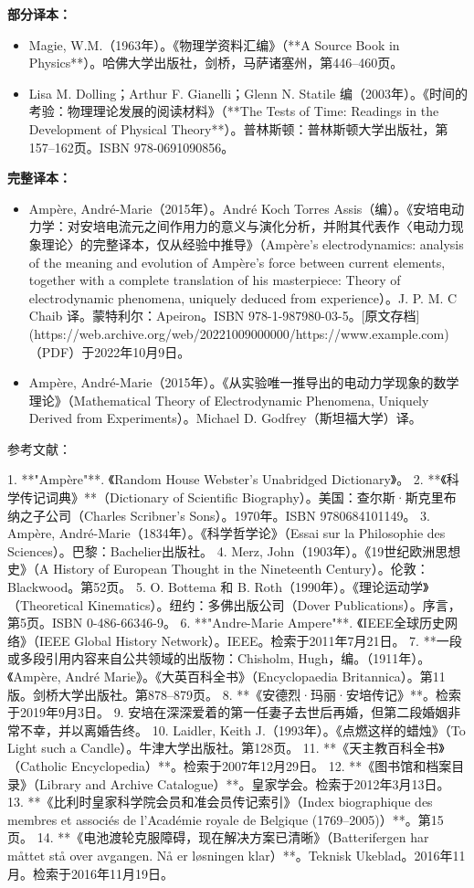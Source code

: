 \textbf{部分译本：}
\begin{itemize}
\item Magie, W.M.（1963年）。《物理学资料汇编》（**A Source Book in Physics**）。哈佛大学出版社，剑桥，马萨诸塞州，第446–460页。
\item Lisa M. Dolling；Arthur F. Gianelli；Glenn N. Statile 编（2003年）。《时间的考验：物理理论发展的阅读材料》（**The Tests of Time: Readings in the Development of Physical Theory**）。普林斯顿：普林斯顿大学出版社，第157–162页。ISBN 978-0691090856。
\end{itemize}
\textbf{完整译本：}
\begin{itemize}
\item Ampère, André-Marie（2015年）。André Koch Torres Assis（编）。《安培电动力学：对安培电流元之间作用力的意义与演化分析，并附其代表作〈电动力现象理论〉的完整译本，仅从经验中推导》（Ampère's electrodynamics: analysis of the meaning and evolution of Ampère's force between current elements, together with a complete translation of his masterpiece: Theory of electrodynamic phenomena, uniquely deduced from experience）。J. P. M. C Chaib 译。蒙特利尔：Apeiron。ISBN 978-1-987980-03-5。[原文存档](https://web.archive.org/web/20221009000000/https://www.example.com)（PDF）于2022年10月9日。
\item Ampère, André-Marie（2015年）。《从实验唯一推导出的电动力学现象的数学理论》（Mathematical Theory of Electrodynamic Phenomena, Uniquely Derived from Experiments）。Michael D. Godfrey（斯坦福大学）译。
\end{itemize}
参考文献：

1. **"Ampère"**. 《Random House Webster's Unabridged Dictionary》。  
2. **《科学传记词典》**（Dictionary of Scientific Biography）。美国：查尔斯·斯克里布纳之子公司（Charles Scribner's Sons）。1970年。ISBN 9780684101149。  
3. Ampère, André-Marie（1834年）。《科学哲学论》（Essai sur la Philosophie des Sciences）。巴黎：Bachelier出版社。  
4. Merz, John（1903年）。《19世纪欧洲思想史》（A History of European Thought in the Nineteenth Century）。伦敦：Blackwood。第52页。  
5. O. Bottema 和 B. Roth（1990年）。《理论运动学》（Theoretical Kinematics）。纽约：多佛出版公司（Dover Publications）。序言，第5页。ISBN 0-486-66346-9。  
6. **"Andre-Marie Ampere"**. 《IEEE全球历史网络》（IEEE Global History Network）。IEEE。检索于2011年7月21日。  
7. **一段或多段引用内容来自公共领域的出版物：Chisholm, Hugh，编。（1911年）。《Ampère, André Marie》。《大英百科全书》（Encyclopaedia Britannica）。第11版。剑桥大学出版社。第878–879页。  
8. **《安德烈·玛丽·安培传记》**。检索于2019年9月3日。  
9. 安培在深深爱着的第一任妻子去世后再婚，但第二段婚姻非常不幸，并以离婚告终。  
10. Laidler, Keith J.（1993年）。《点燃这样的蜡烛》（To Light such a Candle）。牛津大学出版社。第128页。  
11. **《天主教百科全书》（Catholic Encyclopedia）**。检索于2007年12月29日。  
12. **《图书馆和档案目录》（Library and Archive Catalogue）**。皇家学会。检索于2012年3月13日。  
13. **《比利时皇家科学院会员和准会员传记索引》（Index biographique des membres et associés de l'Académie royale de Belgique (1769–2005)）**。第15页。  
14. **《电池渡轮克服障碍，现在解决方案已清晰》（Batterifergen har måttet stå over avgangen. Nå er løsningen klar）**。Teknisk Ukeblad。2016年11月。检索于2016年11月19日。